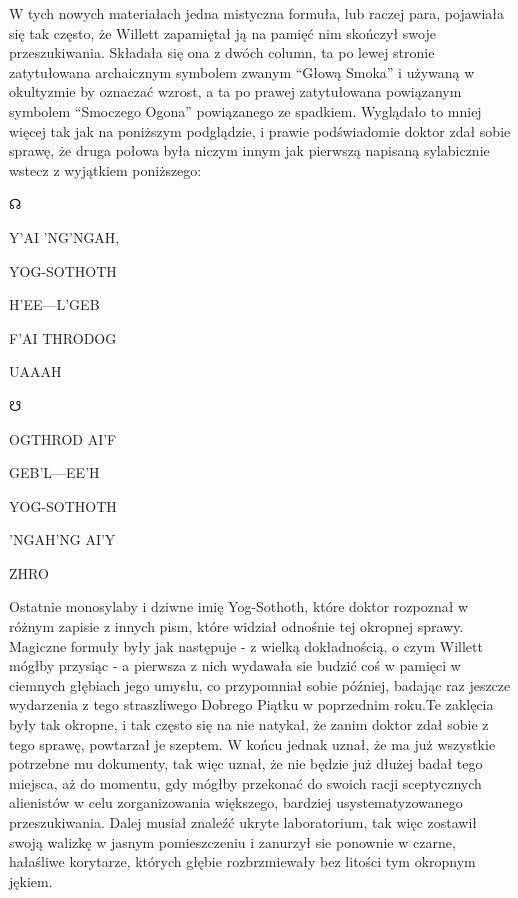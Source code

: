W tych nowych materiałach jedna mistyczna formuła, lub raczej para, pojawiała się tak często, że Willett zapamiętał ją na pamięć nim skończył swoje przeszukiwania. Składała się ona z dwóch column, ta po lewej stronie zatytułowana archaicznym symbolem zwanym ``Głową Smoka'' i używaną w okultyzmie by oznaczać wzrost, a ta po prawej zatytułowana powiązanym symbolem ``Smoczego Ogona'' powiązanego ze spadkiem. Wyglądało to mniej więcej tak jak na poniższym podglądzie, i prawie podświadomie doktor zdał sobie sprawę, że druga połowa była niczym innym jak pierwszą napisaną sylabicznie wstecz z wyjątkiem poniższego:


\begin{multicols}{2}

\begin{center}


{\Huge ☊}

Y'AI 'NG'NGAH,	

YOG-SOTHOTH	

H'EE—L'GEB	

F'AI THRODOG	

UAAAH

\end{center}

\begin{center}


{\Huge ☋}

OGTHROD AI'F

GEB'L—EE'H

YOG-SOTHOTH

'NGAH'NG AI'Y

ZHRO

\end{center}

\end{multicols}

Ostatnie monosylaby i dziwne imię Yog-Sothoth, które doktor rozpoznał w różnym zapisie z innych pism, które widział odnośnie tej okropnej sprawy. Magiczne formuły były jak następuje - z wielką dokładnością, o czym Willett mógłby przysiąc - a pierwsza z nich wydawała sie budzić coś w pamięci w ciemnych głębiach jego umysłu, co przypomniał sobie później, badając raz jeszcze wydarzenia z tego straszliwego Dobrego Piątku w poprzednim roku.Te zaklęcia były tak okropne, i tak często się na nie natykał, że zanim doktor zdał sobie z tego sprawę, powtarzał je szeptem. W końcu jednak uznał, że ma już wszystkie potrzebne mu dokumenty, tak więc uznał, że nie będzie już dłużej badał tego miejsca, aż do momentu, gdy mógłby przekonać do swoich racji sceptycznych alienistów w celu zorganizowania większego, bardziej usystematyzowanego przeszukiwania. Dalej musiał znaleźć ukryte laboratorium, tak więc zostawił swoją walizkę w jasnym pomieszczeniu i zanurzył sie ponownie w czarne, hałaśliwe korytarze, których głębie rozbrzmiewały bez litości tym okropnym jękiem. 

